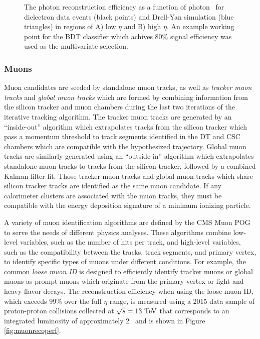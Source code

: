 \begin{figure}[htbp]
{  }
  \caption[Photon Reconstruction Efficiency]{The photon reconstruction efficiency as a function of photon \pT\ for dielectron data events (black points) and Drell-Yan simulation (blue triangles) in regions of A) low $\eta$ and B) high $\eta$. An example working point for the BDT classifier which achives 80\% signal efficiency was used as the multivariate selection.\cite{CMSPHOTPERF}}
    \label{fig:photrecoeff}
\end{figure}

\subsubsection{Muons}

Muon candidates are seeded by standalone muon tracks, as well as \textit{tracker muon tracks} and \textit{global muon tracks} which are formed by combining information from the silicon tracker and muon chambers during the last two iterations of the iterative tracking algorithm. The tracker muon tracks are generated by an ``inside-out'' algorithm which extrapolates tracks from the silicon tracker which pass a momentum threshold to track segments identified in the DT and CSC chambers which are compatible with the hypothesized trajectory. Global muon tracks are similarly generated using an ``outside-in'' algorithm which extrapolates standalone muon tracks to tracks from the silicon tracker, followed by a combined Kalman filter fit. Those tracker muon tracks and global muon tracks which share silicon tracker tracks are identified as the same muon candidate. If any calorimeter clusters are associated with the muon tracks, they must be compatible with the energy deposition signature of a minimum ionizing particle.

A variety of muon identification algorithms are defined by the CMS Muon POG to serve the needs of different physics analyses. These algorithms combine low-level variables, such as the number of hits per track, and high-level variables, such as the compatibility between the tracks, track segments, and primary vertex, to identify specific types of muons under different conditions. For example, the common \textit{loose muon ID} is designed to efficiently identify tracker muons or global muons as prompt muons which originate from the primary vertex or light and heavy flavor decays.\cite{CMSMUONPERF} The reconstruction efficiency when using the loose muon ID, which exceeds 99\% over the full $\eta$ range, is measured using a 2015 data sample of proton-proton collisions collected at $\sqrt{s} = 13\ \mathrm{TeV}$ that corresponds to an integrated luminosity of approximately 2 \invfb\ and is shown in Figure \ref{fig:muonrecoperf}.


